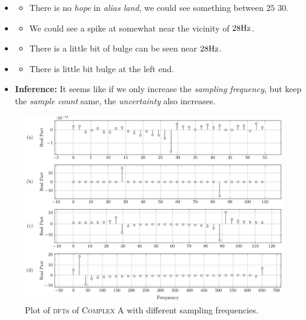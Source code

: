 \documentclass[../../course]{subfiles}
\begin{document}
\begin{itemize} [label=]

    \item \sampFreqMuchLess
        \begin{itemize} [label=]
            \item There is no \emph{hope} in \emph{alias land}, we could see
                something between $25$ $30$.
        \end{itemize}

    \item \sampFreqNorm
        \begin{itemize} [label=]
            \item We could see a spike at somewhat near the vicinity of $\freqXOne \si{Hz}$.
        \end{itemize}

    \item \sampFreqSligGreat
        \begin{itemize} [label=]
            \item There is a little bit of bulge can be seen near $\freqXOne \si{Hz}$.
        \end{itemize}

    \item \sampFreqMuchGreat
        \begin{itemize} [label=]
            \item There is little bit bulge at the left end.
        \end{itemize}

    \item \textbf{Inference:} It seems like if we only increase the \emph{sampling frequency},
        but keep the \emph{sample count} same, the \emph{uncertainty} also increases.

\end{itemize}

\vfill

\begin{figure} [H]
    \centering
     {
        \includegraphics[height = 0.8\textheight] {tikzpics/plotDftComplexA32.pdf}
    }
     {Plot of \textsc{dft}s of \textsc{Complex A} with different sampling frequencies.}
    \label{plt:dftCplxA32}
\end{figure}
\end{document}
